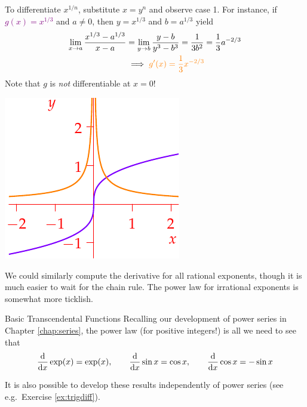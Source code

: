 \begin{examples}{}{}
\begin{enumerate}
		\begin{minipage}[t]{0.7\linewidth}\vspace{0pt}
			\item To differentiate $x^{1/n}$, substitute $x=y^n$ and observe case 1. For instance, if \textcolor{purple}{$g(x)=x^{1/3}$} and $a\neq 0$, then $y=x^{1/3}$ and $b=a^{1/3}$ yield
			\begin{align*}
				\lim_{x\to a}\frac{x^{1/3}-a^{1/3}}{x-a}&= \lim_{y\to b}\frac{y-b}{y^3-b^3} = \frac 1{3b^2}=\frac 13a^{-2/3}\\
				&\implies \textcolor{orange}{g'(x)=\frac 13x^{-2/3}}
			\end{align*}
			Note that $g$ is \emph{not} differentiable at $x=0$!
		\end{minipage}\begin{minipage}[t]{0.3\linewidth}\vspace{0pt}
			\flushright\includegraphics[scale=0.95]{diff-exthird}
		\end{minipage}
	\end{enumerate}
	 We could similarly compute the derivative for all rational exponents, though it is much easier to wait for the chain rule. The power law for irrational exponents is somewhat more ticklish.
\end{examples}


\begin{cor}{Basic Transcendental Functions}{}
	Recalling our development of power series in Chapter \ref{chap:series}, the power law (for positive integers!) is all we need to see that
	\[
		\frac{\mathrm{d} }{\mathrm{d} x}\exp(x)=\exp(x),\qquad 
		\frac{\mathrm{d} }{\mathrm{d} x}\sin x=\cos x,\qquad 
		\frac{\mathrm{d} }{\mathrm{d} x}\cos x=-\sin x
	\]
\end{cor}

It is also possible to develop these results independently of power series (see e.g.\ Exercise \ref{ex:trigdiff}).
\goodbreak


